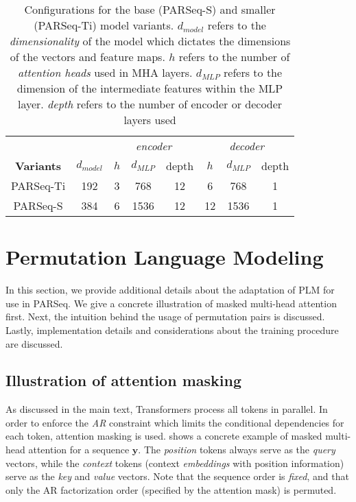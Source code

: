 \begin{table}[ht]
  \centering
  \setlength{\tabcolsep}{8pt}
  \caption[Configurations for PARSeq-S and PARSeq-Ti model variants.]{Configurations for the base (PARSeq-S) and smaller (PARSeq-Ti) model variants. $d_{model}$ refers to the \textit{dimensionality} of the model which dictates the dimensions of the vectors and feature maps. $h$ refers to the number of \textit{attention heads} used in MHA layers. $d_{MLP}$ refers to the dimension of the intermediate features within the MLP layer. \textit{depth} refers to the number of encoder or decoder layers used}
  \begin{tabular}{c|c|c c c|c c c}
    \toprule
    & & \multicolumn{3}{c}{\textit{encoder}} & \multicolumn{3}{c}{\textit{decoder}} \\
    \textbf{Variants} & $d_{model}$ & $h$ & $d_{MLP}$ &
      depth & $h$ & $d_{MLP}$ & depth \\
    \midrule
      PARSeq-Ti & 192 & 3 & 768 & 12 & 6 & 768 & 1 \\
      PARSeq-S & 384 & 6 & 1536 & 12 & 12 & 1536 & 1 \\
    \bottomrule
  \end{tabular}
  \label{tab:arch-config}
\end{table}


\section{Permutation Language Modeling}
\label{sec:plm-appendix}

In this section, we provide additional details about the adaptation of PLM for use in PARSeq. We give a concrete illustration of masked multi-head attention first. Next, the intuition behind the usage of permutation pairs is discussed. Lastly, implementation details and considerations about the training procedure are discussed.

\subsection{Illustration of attention masking}

As discussed in the main text, Transformers process all tokens in parallel. In order to enforce the \textit{AR} constraint which limits the conditional dependencies for each token, attention masking is used.  shows a concrete example of masked multi-head attention for a sequence $\mathbf{y}$. The \textit{position} tokens always serve as the \textit{query} vectors, while the \textit{context} tokens (context \textit{embeddings} with position information) serve as the \textit{key} and \textit{value} vectors. Note that the sequence order is \textit{fixed}, and that only the AR factorization order (specified by the attention mask) is permuted.

